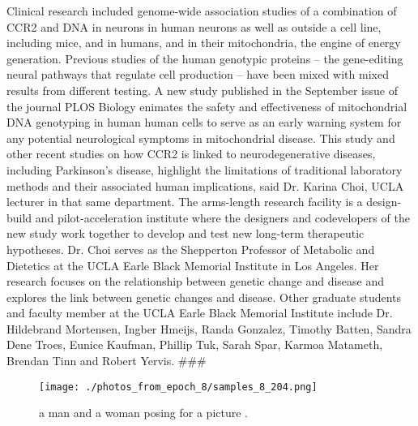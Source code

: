 \documentclass{article}%
\begin{document}
Clinical research included genome{-}wide association studies of a combination of CCR2 and DNA in neurons in human neurons as well as outside a cell line, including mice, and in humans, and in their mitochondria, the engine of energy generation. Previous studies of the human genotypic proteins – the gene{-}editing neural pathways that regulate cell production – have been mixed with mixed results from different testing. A new study published in the September issue of the journal PLOS Biology enimates the safety and effectiveness of mitochondrial DNA genotyping in human human cells to serve as an early warning system for any potential neurological symptoms in mitochondrial disease.\newline%
This study and other recent studies on how CCR2 is linked to neurodegenerative diseases, including Parkinson’s disease, highlight the limitations of traditional laboratory methods and their associated human implications, said Dr. Karina Choi, UCLA lecturer in that same department.\newline%
The arms{-}length research facility is a design{-}build and pilot{-}acceleration institute where the designers and codevelopers of the new study work together to develop and test new long{-}term therapeutic hypotheses.\newline%
Dr. Choi serves as the Shepperton Professor of Metabolic and Dietetics at the UCLA Earle Black Memorial Institute in Los Angeles. Her research focuses on the relationship between genetic change and disease and explores the link between genetic changes and disease.\newline%
Other graduate students and faculty member at the UCLA Earle Black Memorial Institute include Dr. Hildebrand Mortensen, Ingber Hmeijs, Randa Gonzalez, Timothy Batten, Sandra Dene Troes, Eunice Kaufman, Phillip Tuk, Sarah Spar, Karmoa Matameth, Brendan Tinn and Robert Yervis.\newline%
\#\#\#\newline%

%


\begin{figure}[h!]%
\centering%
\texttt{[image: ./photos\_from\_epoch\_8/samples\_8\_204.png]}%
\caption{a man and a woman posing for a picture .}%
\end{figure}

%
\end{document}
